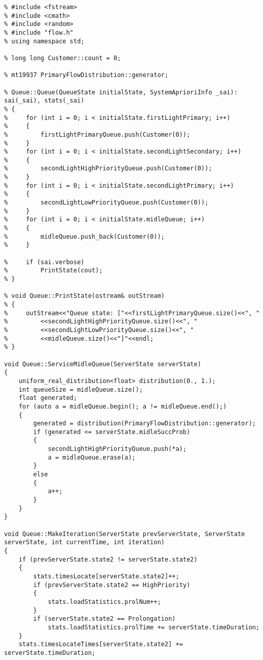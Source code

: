 \begin{lstlisting}[language={[ISO]C++}]
% #include "queue.h"
% #include <fstream>
% #include <cmath>
% #include <random>
% #include "flow.h"
% using namespace std;

% long long Customer::count = 0;

% mt19937 PrimaryFlowDistribution::generator;

% Queue::Queue(QueueState initialState, SystemAprioriInfo _sai): sai(_sai), stats(_sai)
% {
%     for (int i = 0; i < initialState.firstLightPrimary; i++)
%     {
%         firstLightPrimaryQueue.push(Customer(0));
%     }
%     for (int i = 0; i < initialState.secondLightSecondary; i++)
%     {
%         secondLightHighPriorityQueue.push(Customer(0));
%     }
%     for (int i = 0; i < initialState.secondLightPrimary; i++)
%     {
%         secondLightLowPriorityQueue.push(Customer(0));
%     }
%     for (int i = 0; i < initialState.midleQueue; i++)
%     {
%         midleQueue.push_back(Customer(0));
%     }

%     if (sai.verbose)
%         PrintState(cout);
% }

% void Queue::PrintState(ostream& outStream)
% {
%     outStream<<"Queue state: ["<<firstLightPrimaryQueue.size()<<", "
%         <<secondLightHighPriorityQueue.size()<<", "
%         <<secondLightLowPriorityQueue.size()<<", "
%         <<midleQueue.size()<<"]"<<endl;
% }

void Queue::ServiceMidleQueue(ServerState serverState)
{
    uniform_real_distribution<float> distribution(0., 1.);
    int queueSize = midleQueue.size();
    float generated;
    for (auto a = midleQueue.begin(); a != midleQueue.end();)
    {
        generated = distribution(PrimaryFlowDistribution::generator);
        if (generated <= serverState.midleSuccProb)
    	{
            secondLightHighPriorityQueue.push(*a);
            a = midleQueue.erase(a);
	    }
        else
	    {
            a++;
	    }
    }
}

void Queue::MakeIteration(ServerState prevServerState, ServerState serverState, int currentTime, int iteration)
{
    if (prevServerState.state2 != serverState.state2)
    {
        stats.timesLocate[serverState.state2]++;
        if (prevServerState.state2 == HighPriority)
        {
            stats.loadStatistics.prolNum++;
        }
        if (serverState.state2 == Prolongation)
            stats.loadStatistics.prolTime += serverState.timeDuration;
    }
    stats.timesLocateTimes[serverState.state2] += serverState.timeDuration;
    

\end{lstlisting}
